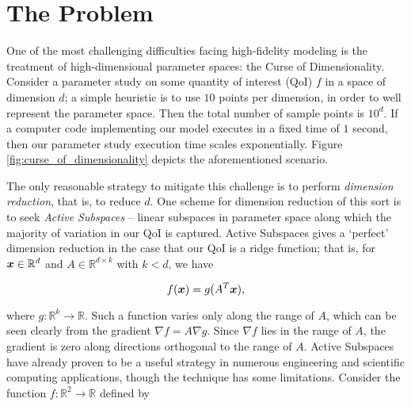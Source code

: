 \documentclass{article}
\begin{document}



\section{The Problem}
One of the most challenging difficulties facing high-fidelity modeling is the treatment of high-dimensional parameter spaces: the Curse of Dimensionality. Consider a parameter study on some quantity of interest (QoI) $f$ in a space of dimension $d$; a simple heuristic is to use $10$ points per dimension, in order to well represent the parameter space. Then the total number of sample points is $10^d$. If a computer code implementing our model executes in a fixed time of $1$ second, then our parameter study execution time scales exponentially. Figure \ref{fig:curse_of_dimensionality} depicts the aforementioned scenario.


The only reasonable strategy to mitigate this challenge is to perform \emph{dimension reduction}, that is, to reduce $d$. One scheme for dimension reduction of this sort is to seek \emph{Active Subspaces} -- linear subspaces in parameter space along which the majority of variation in our QoI is captured. \cite{constantine2015} Active Subspaces gives a `perfect' dimension reduction in the case that our QoI is a ridge function; that is, for $\boldsymbol{x}\in\mathbb{R}^d$ and $A\in\mathbb{R}^{d\times k}$ with $k<d$, we have

\begin{equation}
f(\boldsymbol{x}) = g(A^T\boldsymbol{x}),
\end{equation}

where $g:\mathbb{R}^k\to\mathbb{R}$. Such a function varies only along the range of $A$, which can be seen clearly from the gradient $\nabla f=A\nabla g$. Since $\nabla f$ lies in the range of $A$, the gradient is zero along directions orthogonal to the range of $A$. Active Subspaces have already proven to be a useful strategy in numerous engineering and scientific computing applications, though the technique has some limitations. Consider the function $f:\mathbb{R}^2\to\mathbb{R}$ defined by
\end{document}
